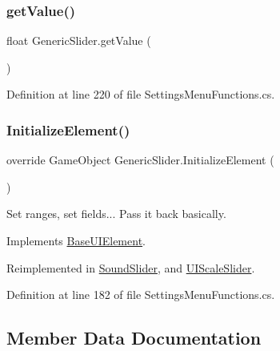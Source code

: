 \subsubsection{\texorpdfstring{get\+Value()}{getValue()}}
{\footnotesize\ttfamily float Generic\+Slider.\+get\+Value (\begin{DoxyParamCaption}{ }\end{DoxyParamCaption})}



Definition at line 220 of file Settings\+Menu\+Functions.\+cs.

\mbox{\label{class_generic_slider_afcfeee7d737e3cfc793739021a75e67c}} 
\subsubsection{\texorpdfstring{Initialize\+Element()}{InitializeElement()}}
{\footnotesize\ttfamily override Game\+Object Generic\+Slider.\+Initialize\+Element (\begin{DoxyParamCaption}{ }\end{DoxyParamCaption})\hspace{0.3cm}{\ttfamily [virtual]}}



Set ranges, set fields... Pass it back basically. 



Implements \hyperlink{class_base_u_i_element_a9a0aa6ac0b194f90e092b372adce4e30}{Base\+U\+I\+Element}.



Reimplemented in \hyperlink{class_sound_slider_a49202c614f0626d21bf6d086090c0720}{Sound\+Slider}, and \hyperlink{class_u_i_scale_slider_a903948c2821f73a3f820fc22ae0064c3}{U\+I\+Scale\+Slider}.



Definition at line 182 of file Settings\+Menu\+Functions.\+cs.



\subsection{Member Data Documentation}
\mbox{\label{class_generic_slider_a8ec4906d47d17525431e78118aee89a3}} 
